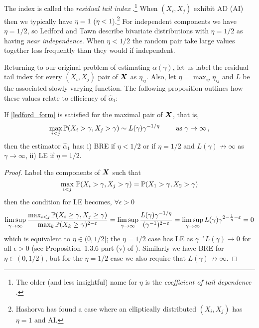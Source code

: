 The index is called the \emph{residual tail index} \cite{de2007extreme,nolde2014geometric}.\footnote{The older (and less insightful) name for $\eta$ is the \emph{coefficient of tail dependence} \cite{ledford1996statistics,resnick2002hidden}.} When $(X_i, X_j)$ exhibit AD (AI) then we typically have $\eta = 1$ ($\eta < 1$).\footnote{Hashorva \cite{hashorva2010residual} has found a case where an elliptically distributed $(X_i, X_j)$ has $\eta = 1$ and AI.} For independent components we have $\eta = 1/2$, so Ledford and Tawn \cite{ledford1996statistics} describe bivariate distributions with $\eta = 1/2$ as having \emph{near independence}. When $\eta < 1/2$ the random pair take large values together less frequently than they would if independent.

Returning to our original problem of estimating $\alpha(\gamma)$, let us label the residual tail index for every $(X_i,X_j)$ pair of $\bm{X}$ as $\eta_{ij}$. Also, let $\eta=\max_{ij}\eta_{ij}$ and $L$ be the associated slowly varying function. The following proposition outlines how these values relate to efficiency of $\hat{\alpha}_1$:

\begin{proposition}
If \eqref{ledford_form} is satisfied for the maximal pair of $\bm{X}$, that is,
\[ \max_{i < j} \operatorname{{\mathbb P}}(X_i > \gamma, X_j > \gamma) \sim L(\gamma) \gamma^{-1/\eta} \qquad \text{ as } \gamma \to \infty \,, \]
then the estimator $\hat{\alpha}_1$ has: i) BRE if $\eta<1/2$ or if $\eta=1/2$ and $L(\gamma) \not\to \infty$ as $\gamma \to \infty$, ii) LE if $\eta=1/2$.
\end{proposition}

\begin{proof}
Label the components of $\bm{X}$ such that
\[ \max_{i < j} \, \operatorname{{\mathbb P}}(X_i > \gamma,X_j > \gamma) = \operatorname{{\mathbb P}}(X_1 > \gamma,X_2 > \gamma) \]
then the condition for LE becomes, $\forall \epsilon > 0$
\[ \limsup_{\gamma \to \infty} \frac{\max_{i < j} \operatorname{{\mathbb P}}(X_i\ge \gamma, X_j\ge \gamma)}{\max_k \operatorname{{\mathbb P}}(X_k\ge \gamma)^{2-\varepsilon}} =
 \limsup_{\gamma \to \infty} \frac{ L(\gamma) \gamma^{-1/\eta} } { (\gamma^{-1})^{2-\varepsilon} } =
 \limsup_{\gamma \to \infty} L(\gamma) \gamma^{2 - \frac1\eta - \varepsilon} = 0 \]
which is equivalent to $\eta \in (0, 1/2]$; the $\eta=1/2$ case has LE as $\gamma^{-\epsilon} L(\gamma) \to 0$ for all $\epsilon > 0$ (see Proposition~1.3.6 part (v) of \cite{bingham1989regular}). Similarly we have BRE for $\eta \in (0, 1/2)$, but for the $\eta = 1/2$ case we also require that $L(\gamma) \not\to \infty$.
\end{proof}

